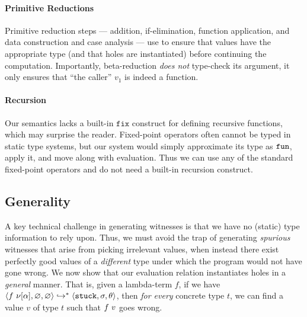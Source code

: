 \paragraph{Primitive Reductions}
%
%
Primitive reduction steps --- addition, if-elimination,
function application, and data construction and case
analysis --- use \forcesym to ensure that values have
the appropriate type (and that holes are instantiated)
before continuing the computation.
%
Importantly, beta-reduction \emph{does not} type-check its
argument, it only ensures that ``the caller'' $v_1$ is indeed
a function.

\paragraph{Recursion}
%
Our semantics lacks a built-in $\mathtt{fix}$ construct
for defining recursive functions, which may surprise
the reader.
%
Fixed-point operators often cannot be typed in static type
systems, but our system would simply approximate its type
as $\mathtt{fun}$, apply it, and move along with evaluation.
%
Thus we can use any of the standard fixed-point operators
and do not need a built-in recursion construct. 




\subsection{Generality}\label{sec:soundness}

A key technical challenge in generating witnesses is
that we have no (static) type information to rely upon.
%
Thus, we must avoid the trap of generating \emph{spurious}
witnesses that arise from picking irrelevant values, when
instead there exist perfectly good values of a \emph{different}
type under which the program would not have gone wrong.
%
We now show that our evaluation relation instantiates holes
in a \emph{general} manner. That is, given a lambda-term $f$,
if we have $\langle f\ \nu[\alpha], \varnothing, \varnothing \rangle \hookrightarrow^{*} \langle \mathtt{stuck}, \sigma, \theta \rangle{}$,
then \emph{for every} concrete type $t$, we can find a value
$v$ of type $t$ such that $f\ v$ goes wrong.


